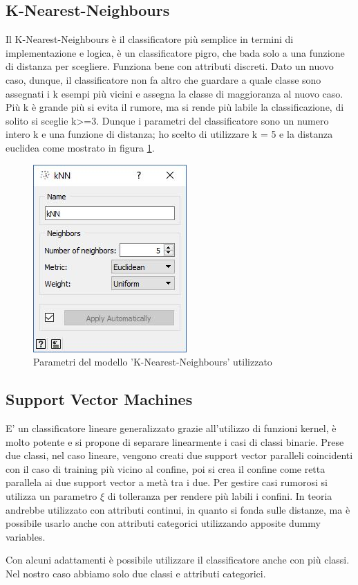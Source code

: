 \documentclass[a4paper, 12p]{report}
\begin{document}
	\subsection{K-Nearest-Neighbours}
	Il K-Nearest-Neighbours è il classificatore più semplice in termini di implementazione e logica, è un classificatore pigro, che bada solo a una funzione di distanza per scegliere. Funziona bene con attributi discreti.
Dato un nuovo caso, dunque, il classificatore non fa altro che guardare a quale classe sono assegnati i k esempi più vicini e assegna la classe di maggioranza al nuovo caso. Più k è grande più si evita il rumore, ma si rende più labile la classificazione, di solito si sceglie k>=3. Dunque i parametri del classificatore sono un numero intero k e una funzione di distanza; ho scelto di utilizzare k = 5 e la distanza euclidea come mostrato in figura \ref{fig:7}.
\begin{figure}	
	\centering
	\includegraphics[scale = 0.8]{img/Knn.JPG}
	\caption{Parametri del modello 'K-Nearest-Neighbours' utilizzato }\label{fig:7}
\end{figure}	

	\subsection{Support Vector Machines}
E' un classificatore lineare generalizzato grazie all'utilizzo di funzioni kernel, è molto potente e si propone di separare linearmente i casi di classi binarie. Prese due classi, nel caso lineare, vengono creati due support vector paralleli coincidenti con il caso di training più vicino al confine, poi si crea il confine come retta parallela ai due support vector a metà tra i due. Per gestire casi rumorosi si utilizza un parametro $\xi$ di tolleranza per rendere più labili i confini. In teoria andrebbe utilizzato con attributi continui, in quanto si fonda sulle distanze, ma è possibile usarlo anche con attributi categorici utilizzando apposite dummy variables.

Con alcuni adattamenti è possibile utilizzare il classificatore anche con più classi.
Nel nostro caso abbiamo solo due classi e attributi categorici.
\end{document}
